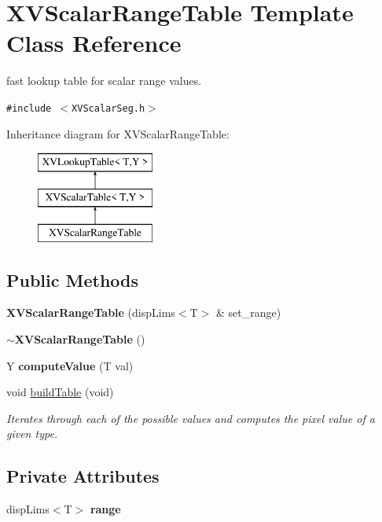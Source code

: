 \hypertarget{class_XVScalarRangeTable}{
\section{XVScalar\-Range\-Table  Template Class Reference}
\label{XVScalarRangeTable}
}
fast lookup table for scalar range values. 


{\tt \#include $<$XVScalar\-Seg.h$>$}

Inheritance diagram for XVScalar\-Range\-Table:\begin{figure}[H]
\begin{center}
\leavevmode
\includegraphics[height=3cm]{class_XVScalarRangeTable}
\end{center}
\end{figure}
\subsection*{Public Methods}
\begin{CompactItemize}
\item 
{\bf XVScalar\-Range\-Table} (disp\-Lims$<$T$>$ \& set\_\-range)
\item 
{\bf $\sim$XVScalar\-Range\-Table} ()
\item 
Y {\bf compute\-Value} (T val)
\item 
\label{XVScalarRangeTable_a3}
\hypertarget{class_XVScalarRangeTable_a3}{
void \hyperlink{class_XVScalarRangeTable_a3}{build\-Table} (void)}

\begin{CompactList}\small\item\em Iterates through each of the possible values and computes the pixel value of a given type.\item\end{CompactList}\end{CompactItemize}
\subsection*{Private Attributes}
\begin{CompactItemize}
\item 
disp\-Lims$<$T$>$ {\bf range}
\end{CompactItemize}


